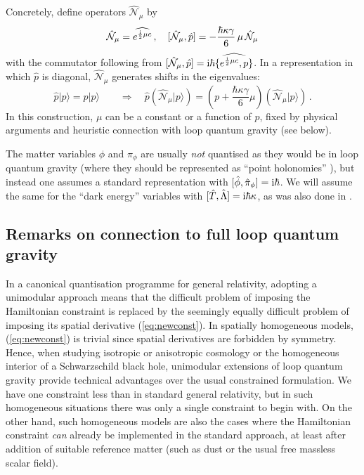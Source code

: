 \documentclass[aps,prd,11pt,showkeys,nofootinbib]{revtex4-2}
\def\im{{\rm i}}
\begin{document}
Concretely, define operators $\hat{\mathcal{N}}_\mu$ by \cite{Banerjee:2011qu}
\begin{equation}
   \hat{\mathcal{N}}_\mu = \widehat{e^{\frac{{\rm i}}{2}\mu c}}\,, \quad [\hat{\mathcal{N}}_\mu,\hat{p}]=-\frac{\hbar\kappa\gamma}{6}\,\mu\,\hat{\mathcal{N}}_\mu
\end{equation}
with the commutator following from $[\hat{\mathcal{N}}_\mu,\hat{p}]={\rm i}\hbar\widehat{\{e^{\frac{{\rm i}}{2}\mu c},p\}}$. In a representation in which $\hat{p}$ is diagonal, $\hat{\mathcal{N}}_\mu$ generates shifts in the eigenvalues:
\begin{equation}
   \hat{p}|p\rangle=p|p\rangle\qquad \Rightarrow\quad\hat{p}\left(\hat{\mathcal{N}}_\mu|p\rangle\right) = \left(p+\frac{\hbar\kappa\gamma}{6}\mu\right)\left(\hat{\mathcal{N}}_\mu|p\rangle\right)\,.
\end{equation}
In this construction, $\mu$ can be a constant or a function of $p$, fixed by physical arguments and heuristic connection with loop quantum gravity (see below).

The matter variables $\phi$ and $\pi_\phi$ are usually {\em not} quantised as they would be in loop quantum gravity (where they should be represented as ``point holonomies'' \cite{Thiemann:1997rq}), but instead one assumes a standard representation with $[\hat\phi,\hat{\pi}_\phi]={\im}\hbar$. We will assume the same for the ``dark energy'' variables with $[\hat{T},\hat{\Lambda}]={\im}\hbar\kappa$, as was also done in \cite{Chiou:2010ne}.

\subsection{Remarks on connection to full loop quantum gravity}

In a canonical quantisation programme for general relativity, adopting a unimodular approach means that the difficult problem of imposing the Hamiltonian constraint is replaced by the seemingly equally difficult problem of imposing its spatial derivative (\ref{eq:newconst}). In spatially homogeneous models, (\ref{eq:newconst}) is trivial since spatial derivatives are forbidden by symmetry. Hence, when studying isotropic or anisotropic cosmology or the homogeneous interior of a Schwarzschild black hole, unimodular extensions of loop quantum gravity provide technical advantages over the usual constrained formulation. We have one constraint less than in standard general relativity, but in such homogeneous situations there was only a single constraint to begin with. On the other hand, such homogeneous models are also the cases where the Hamiltonian constraint {\em can} already be implemented in the standard approach, at least after addition of suitable reference matter (such as dust or the usual free massless scalar field).
\end{document}
